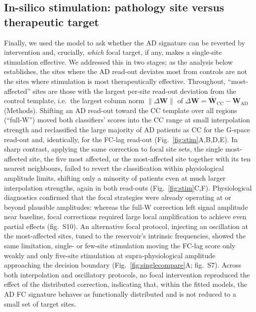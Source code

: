 \documentclass[11pt]{article}
\begin{document}
\subsection*{In-silico stimulation: pathology site versus therapeutic target}
Finally, we used the model to ask whether the AD signature can be reverted by
intervention and, crucially, \emph{which} focal target, if any, makes a
single-site stimulation effective. We addressed this in two stages; as the
analysis below establishes, the sites where the AD read-out deviates most from
controls are not the sites where stimulation is most therapeutically effective.
Throughout, ``most-affected'' sites are those with the largest per-site read-out
deviation from the control template, i.e.\ the largest column norm
$\lVert\Delta\mathbf{W}\rVert$ of $\Delta\mathbf{W}=\bar{\mathbf{W}}_{\mathrm{CC}}
-\mathbf{W}_{\mathrm{AD}}$ (Methods). Shifting an AD
read-out toward the CC template over all regions (``full-W'') moved both
classifiers' scores into the CC range at small interpolation strength and
reclassified the large majority of AD patients as CC
for the G-space read-out and, identically, for the FC-lag read-out
(Fig.~\ref{fig:stim}A,B,D,E). In sharp contrast, applying the same correction to
focal site sets, the single most-affected site, the five most affected, or the
most-affected site together with its ten nearest neighbours, failed to revert
the classification within physiological amplitude limits, shifting only a
minority of patients even at much larger interpolation strengths, again in both
read-outs (Fig.~\ref{fig:stim}C,F). Physiological
diagnostics confirmed that the focal strategies were already operating at or
beyond plausible amplitudes: whereas the full-W correction left signal amplitude
near baseline, focal corrections required large local amplification to achieve
even partial effects (fig.~S10). An alternative focal
protocol, injecting an oscillation at the most-affected sites, tuned to the
reservoir's intrinsic frequencies, showed the same limitation, single- or
few-site stimulation moving the FC-lag score only weakly and only five-site
stimulation at supra-physiological amplitude approaching the decision boundary
(Fig.~\ref{fig:singlecompare}A; fig.~S7). Across both interpolation and oscillatory protocols,
no focal intervention reproduced the effect of the distributed correction,
indicating that, within the fitted models, the AD FC signature behaves as
functionally distributed and is not reduced to a small set of target sites.
\end{document}
